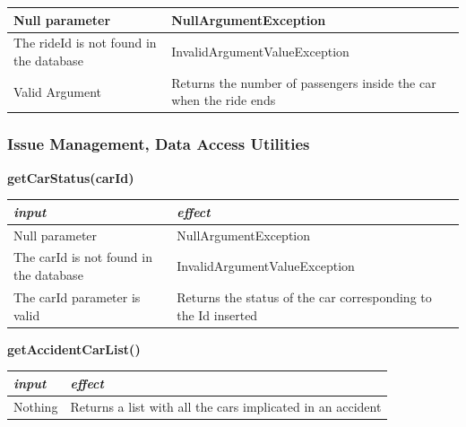 \documentclass{article}
\begin{document}
\begin{flushleft}
\begin{center}
\begin{tabular}{  |  p{6cm} | p{6cm} |}
    Null parameter & NullArgumentException
     \\ 
  \hline
   The rideId is not found in the database &  InvalidArgumentValueException\\
  \hline
  Valid Argument & Returns the number of passengers inside the car when the ride ends    \\
  \hline
    \end{tabular}
\end{center}
   
   
   
    \subsubsection{Issue Management, Data Access Utilities}  %
    
      \begin{center}
   \begin {flushleft}
    \textbf{getCarStatus(carId)}
    \end{flushleft}
        \begin{tabular}{  |  p{6cm} | p{6cm} |}
    \hline
    \textit{input} &  \textit{effect} \\
    \hline
    
    Null parameter & NullArgumentException
     \\ 
  \hline
   The carId is not found in the database & InvalidArgumentValueException  \\
  \hline
  The carId parameter is valid &  Returns the status of the car corresponding to the Id inserted  \\
  \hline
    \end{tabular}
\end{center}


  \begin{center}
   \begin {flushleft}
    \textbf{getAccidentCarList()}
    \end{flushleft}
        \begin{tabular}{  |  p{6cm} | p{6cm} |}
    \hline
    \textit{input} &  \textit{effect} \\
    \hline
    
    Nothing & Returns a list with all the cars implicated in an accident 
     \\ 

  \hline
    \end{tabular}
\end{center}


\end{flushleft}
\end{document}
